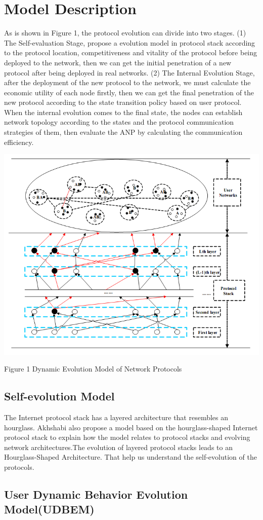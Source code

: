 \documentclass{article}
\begin{document}
\section{Model Description}
As is shown in Figure 1, the protocol evolution can divide into two stages. (1) The Self-evaluation Stage, propose a
evolution model in protocol stack according to the protocol location, competitiveness and vitality of the protocol
before being deployed to the network, then we can get the initial penetration of a new protocol after being deployed
in real networks. (2) The Internal Evolution Stage, after the deployment of the new protocol to the network, we must
calculate the economic utility of each node firstly, then we can get the final penetration of the new protocol
according to the state transition policy based on user protocol. When the internal evolution comes to the final state,
the nodes can establish network topology according to the states and the protocol communication strategies of them,
then evaluate the ANP by calculating the communication efficiency.
\par

\centerline{\includegraphics[width=.45\textwidth]{Figure1.png}}
\centerline{Figure 1 Dynamic Evolution Model of Network Protocols}

\subsection{Self-evolution Model}

The Internet protocol stack has a layered architecture that resembles an hourglass. Akhshabi also propose a model based
on the hourglass-shaped Internet protocol stack to explain how the model relates to protocol stacks and evolving network
architectures.The evolution of layered protocol stacks leads to an Hourglass-Shaped Architecture. That help us understand
the self-evolution of the protocols.

\subsection{User Dynamic Behavior Evolution Model(UDBEM)}
\end{document}
